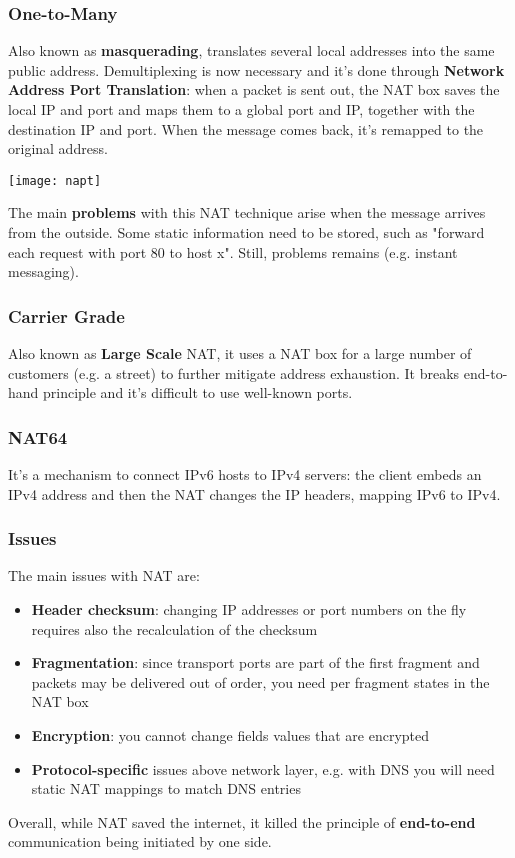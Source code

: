 \subsubsection{One-to-Many}
Also known as \textbf{masquerading}, translates several local addresses into the same public address. Demultiplexing is now necessary and it's done through \textbf{Network Address Port Translation}: when a packet is sent out, the NAT box saves the local IP and port and maps them to a global port and IP, together with the destination IP and port. When the message comes back, it's remapped to the original address.
\begin{center}
	\texttt{[image: napt]}
\end{center}
The main \textbf{problems} with this NAT technique arise when the message arrives from the outside. Some static information need to be stored, such as "forward each request with port 80 to host x". Still, problems remains (e.g. instant messaging).

\subsubsection{Carrier Grade}
Also known as \textbf{Large Scale} NAT, it uses a NAT box for a large number of customers (e.g. a street) to further mitigate address exhaustion. It breaks end-to-hand principle and it's difficult to use well-known ports.

\subsubsection{NAT64}
It's a mechanism to connect IPv6 hosts to IPv4 servers: the client embeds an IPv4 address and then the NAT changes the IP headers, mapping IPv6 to IPv4.

\subsubsection{Issues}
The main issues with NAT are:
\begin{itemize}
	\item \textbf{Header checksum}: changing IP addresses or port numbers on the fly requires also the recalculation of the checksum
	\item \textbf{Fragmentation}: since transport ports are part of the first fragment and packets may be delivered out of order, you need per fragment states in the NAT box
	\item \textbf{Encryption}: you cannot change fields values that are encrypted
	\item \textbf{Protocol-specific} issues above network layer, e.g. with DNS you will need static NAT mappings to match DNS entries
\end{itemize}
Overall, while NAT saved the internet, it killed the principle of \textbf{end-to-end} communication being initiated by one side.

